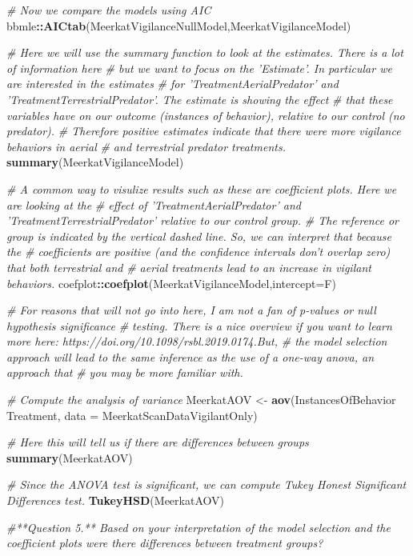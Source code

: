 \documentclass[]{book}
\newenvironment{Shaded}{\begin{snugshade}}{\end{snugshade}}
\newcommand{\CommentTok}[1]{\textcolor[rgb]{0.56,0.35,0.01}{\textit{#1}}}
\newcommand{\DataTypeTok}[1]{\textcolor[rgb]{0.13,0.29,0.53}{#1}}
\newcommand{\KeywordTok}[1]{\textcolor[rgb]{0.13,0.29,0.53}{\textbf{#1}}}
\newcommand{\NormalTok}[1]{#1}
\newcommand{\OperatorTok}[1]{\textcolor[rgb]{0.81,0.36,0.00}{\textbf{#1}}}
\newcommand{\StringTok}[1]{\textcolor[rgb]{0.31,0.60,0.02}{#1}}
\begin{document}
\begin{Shaded}
\begin{Highlighting}[]
\CommentTok{# Now we compare the models using AIC}
\NormalTok{bbmle}\OperatorTok{::}\KeywordTok{AICtab}\NormalTok{(MeerkatVigilanceNullModel,MeerkatVigilanceModel)}

\CommentTok{# Here we will use the summary function to look at the estimates. There is a lot of information here}
\CommentTok{# but we want to focus on the 'Estimate'. In particular we are interested in the estimates}
\CommentTok{# for 'TreatmentAerialPredator' and 'TreatmentTerrestrialPredator'. The estimate is showing the effect}
\CommentTok{# that these variables have on our outcome (instances of behavior), relative to our control (no predator).}
\CommentTok{# Therefore positive estimates indicate that there were more vigilance behaviors in aerial }
\CommentTok{# and terrestrial predator treatments.}
\KeywordTok{summary}\NormalTok{(MeerkatVigilanceModel)}

\CommentTok{# A common way to visulize results such as these are coefficient plots. Here we are looking at the}
\CommentTok{# effect of 'TreatmentAerialPredator' and 'TreatmentTerrestrialPredator' relative to our control group.}
\CommentTok{# The reference or group is indicated by the vertical dashed line. So, we can interpret that because the }
\CommentTok{# coefficients are positive (and the confidence intervals don't overlap zero) that both terrestrial and}
\CommentTok{# aerial treatments lead to an increase in vigilant behaviors.}
\NormalTok{coefplot}\OperatorTok{::}\KeywordTok{coefplot}\NormalTok{(MeerkatVigilanceModel,}\DataTypeTok{intercept=}\NormalTok{F)}


\CommentTok{# For reasons that will not go into here, I am not a fan of p-values or null hypothesis significance}
\CommentTok{# testing. There is a nice overview if you want to learn more here: https://doi.org/10.1098/rsbl.2019.0174.But,}
\CommentTok{# the model selection approach will lead to the same inference as the use of a one-way anova, an approach that }
\CommentTok{# you may be more familiar with.}

\CommentTok{# Compute the analysis of variance}
\NormalTok{MeerkatAOV <-}\StringTok{ }\KeywordTok{aov}\NormalTok{(InstancesOfBehavior }\OperatorTok{~}\StringTok{ }\NormalTok{Treatment, }\DataTypeTok{data =}\NormalTok{ MeerkatScanDataVigilantOnly)}

\CommentTok{# Here this will tell us if there are differences between groups}
\KeywordTok{summary}\NormalTok{(MeerkatAOV)}

\CommentTok{# Since the ANOVA test is significant, we can compute Tukey Honest Significant Differences test.}
\KeywordTok{TukeyHSD}\NormalTok{(MeerkatAOV)}

\CommentTok{#**Question 5.** Based on your interpretation of the model selection and the coefficient plots were there differences between treatment groups?}
\end{Highlighting}
\end{Shaded}
\end{document}
